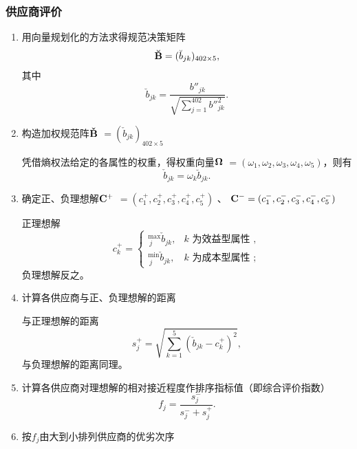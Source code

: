 \subsubsection{供应商评价}

\begin{enumerate}

\item 用向量规划化的方法求得规范决策矩阵
\begin{equation}
 {\bf \breve{B}} =(\breve{b}_{jk})_{402 \times 5},
\end{equation}
其中
\begin{equation}
    \breve{b}_{jk}=\frac{{b''}_{jk}}{\sqrt{\sum_{j=1}^{402}{b''}_{jk}^2}}.
\end{equation}
\item 构造加权规范阵$ \bf \check{B} $ $=(\check{b}_{jk})_{402 \times 5}$

凭借熵权法给定的各属性的权重，得权重向量$ \bf \Omega $ $ =(\omega_1,\omega_2,\omega_3,\omega_4,\omega_5)$，则有
\begin{equation}
    \check{b}_{jk}=\omega_k\breve{b}_{jk}.
\end{equation}
\item 确定正、负理想解$ \bf C^+$ $=(c_1^+,c_2^+,c_3^+,c_4^+,c_5^+)$
、
${\bf C^{-}}=(c_1^-,c_2^-,c_3^-,c_4^-,c_5^-)$

正理想解
\begin{equation}
c_{k}^{+}=\left\{\begin{array}{ll}
{ }_{\ j}^{\max } \check{b}_{jk}, & k \text { 为效益型属性 }, \\
{ }_{\ j}^{\min } \check{b}_{jk}, & k \text { 为成本型属性 };
\end{array}\right.
\end{equation}
负理想解反之。

\item 计算各供应商与正、负理想解的距离

与正理想解的距离
\begin{equation}
    s_j^+=\sqrt{\sum_{k=1}^5(\check{b}_{jk}-c_k^+)^2} ,
\end{equation}
与负理想解的距离同理。
\item 计算各供应商对理想解的相对接近程度作排序指标值（即综合评价指数）
\begin{equation}
    f_j=\frac{s_j^-}{s_j^-+s_j^+}.
\end{equation}
\item 按$f_j$由大到小排列供应商的优劣次序

\end{enumerate}

